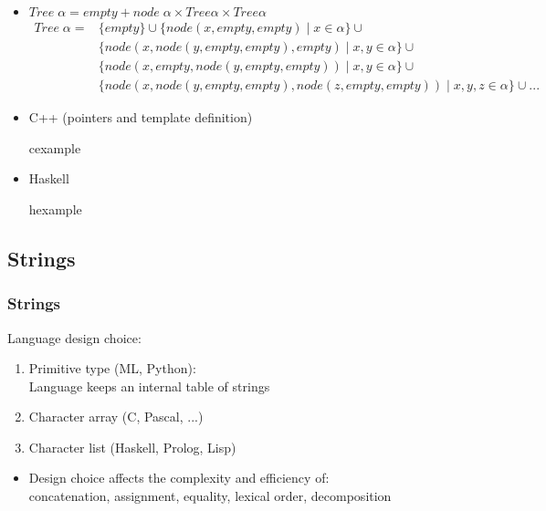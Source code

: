 \begin{frame}
 \begin{itemize}[<+->]
  \item $Tree\;\alpha = empty + node\;\alpha\times Tree \alpha \times Tree \alpha$
{\scriptsize
\[\begin{array}{ll}
Tree\;\alpha= & \{empty\} \cup \{node(x,empty,empty) \mid x \in \alpha\} \cup \\
     & \{node(x,node(y,empty,empty),empty) \mid x,y \in \alpha \} \cup \\
     & \{node(x,empty,node(y,empty,empty)) \mid x,y \in \alpha \} \cup \\
     & \{node(x,node(y,empty,empty),node(z,empty,empty)) \mid x,y,z \in \alpha \} \cup ...
  \end{array}
\]
}
\item C++ (pointers and template definition)
\begin{beamercolorbox}{cexample}
 \codeagacC
\end{beamercolorbox}

\item Haskell
\begin{beamercolorbox}{hexample}
 \codeagacH
\end{beamercolorbox}
 \end{itemize}
\end{frame}

\subsection{Strings}
\begin{frame}
\frametitle{Strings}
Language design choice:
\begin{enumerate}[<+->]
\item Primitive type (ML, Python): \\
	Language keeps an internal table of strings
\item Character array (C, Pascal, ...)
\item Character list (Haskell, Prolog, Lisp)
\end{enumerate}
\begin{itemize}
 \item Design choice affects the complexity and efficiency of:\\
  concatenation, assignment, equality, lexical order, decomposition
\end{itemize}
 \end{frame}

